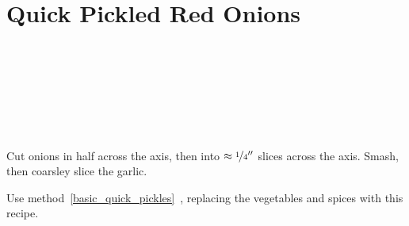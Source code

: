 \section[Pickled Red Onions]{Quick Pickled Red Onions}\label{pickled_red_onions}

\begin{ingredientcolumns}[1]
	\begin{ingredientblock}
		\\
		\\
		\\
		\\
		\\
		\\
	\end{ingredientblock}
\end{ingredientcolumns}


\begin{preparation}
\item Cut onions in half across the axis, then into $\approx\nicefrac{1}{4}''$ slices across the axis.
	Smash, then coarsley slice the garlic.

\item Use method~\ref{basic_quick_pickles}~, replacing the vegetables and spices with this recipe.
\end{preparation}


\recipeend%
